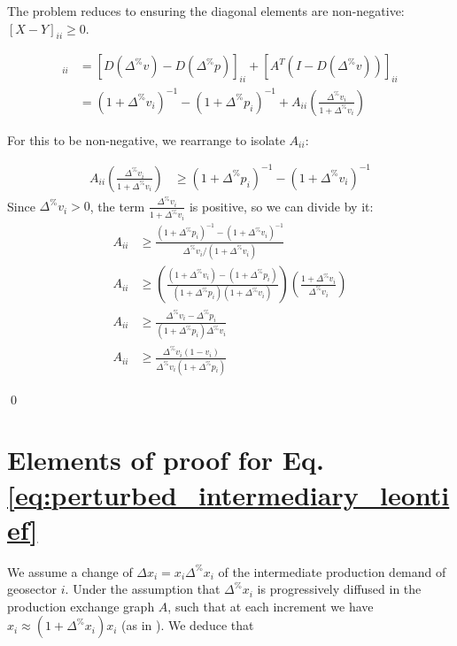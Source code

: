 \documentclass{article}
\begin{document}
The problem reduces to ensuring the diagonal elements are non-negative: $[X-Y]_{ii} \geq 0$.

\begin{align*}
    [X-Y]_{ii} &= [D(\Delta^{\%} v) - D(\Delta^{\%} p)]_{ii} + [A^T(I - D(\Delta^{\%} v))]_{ii} \\
	&= (1+\Delta^{\%} v_i)^{-1} - (1+\Delta^{\%} p_i)^{-1} + A_{ii}\left(\frac{\Delta^{\%} v_i}{1+\Delta^{\%} v_i}\right)
\end{align*}

\noindent For this to be non-negative, we rearrange to isolate $A_{ii}$:

\begin{align*}
    A_{ii}\left(\frac{\Delta^{\%} v_i}{1+\Delta^{\%} v_i}\right) &\geq (1+\Delta^{\%} p_i)^{-1} - (1+\Delta^{\%} v_i)^{-1}
\end{align*}
Since $\Delta^{\%} v_i > 0$, the term $\frac{\Delta^{\%} v_i}{1+\Delta^{\%} v_i}$ is positive, so we can divide by it:
\begin{align*}
    A_{ii} &\geq \frac{(1+\Delta^{\%} p_i)^{-1} - (1+\Delta^{\%} v_i)^{-1}}{\Delta^{\%} v_i/(1+\Delta^{\%} v_i)} \\
    A_{ii} &\geq \left( \frac{(1+\Delta^{\%} v_i) - (1+\Delta^{\%} p_i)}{(1+\Delta^{\%} p_i)(1+\Delta^{\%} v_i)} \right) \left( \frac{1+\Delta^{\%} v_i}{\Delta^{\%} v_i} \right) \\
    A_{ii} &\geq \frac{\Delta^{\%} v_i - \Delta^{\%} p_i}{(1+\Delta^{\%} p_i) \Delta^{\%} v_i} \\
    A_{ii} &\geq \frac{\Delta^{\%} v_i(1-v_i)}{\Delta^{\%} v_i(1+\Delta^{\%} p_i)}
\end{align*}

\qed

\section{Elements of proof for Eq. \eqref{eq:perturbed_intermediary_leontief}}
\label{appendix:proof_competitive_leontief}

We assume a change of $\Delta x_i=x_i \Delta^\% x_i$ of the intermediate production demand of geosector $i$. Under the assumption that $\Delta^\% x_i$ is progressively diffused in the production exchange graph $A$, such that at each increment we have $x_i \approx (1 + \Delta^{\%}x_i) x_i$ (as in \cite{desnos2023climate}). We deduce that
\end{document}
